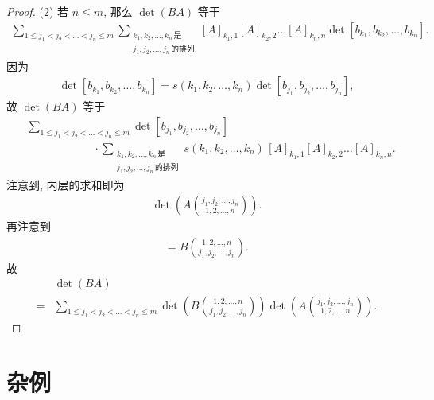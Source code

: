 \documentclass[%
    UTF8,%
    fontset=none,%
    punct=kaiming,%
    zihao=-4,%
    a4paper,%
    oneside,%
]{ctexbook}
\renewcommand*{\leq}{\leqslant}
\begin{document}
\begin{proof}
    (2)
    若 \(n \leq m\),
    那么 \(\det {(BA)}\) 等于
    \begin{align*}
        \sum_{1 \leq j_1 < j_2 < \dots < j_n \leq m}
        {\sum_{\substack{
        k_1, k_2, \dots, k_n\,\text{是} \\
                    j_1, j_2, \dots, j_n\,\text{的排列}
                }}
            {[A]_{k_1,1} [A]_{k_2,2} \dots [A]_{k_n,n}
                \det {[b_{k_1}, b_{k_2}, \dots, b_{k_n}]}}}.
    \end{align*}
    因为
    \begin{align*}
        \det {[b_{k_1}, b_{k_2}, \dots, b_{k_n}]}
        = s(k_1, k_2, \dots, k_n)
        \det {[b_{j_1}, b_{j_2}, \dots, b_{j_n}]},
    \end{align*}
    故 \(\det {(BA)}\) 等于
    \begin{align*}
         &
        \sum_{1 \leq j_1 < j_2 < \dots < j_n \leq m}
        {\det {[b_{j_1}, b_{j_2}, \dots, b_{j_n}]}}
        \\
         & \qquad \qquad \qquad
        \cdot
        \sum_{\substack{
        k_1, k_2, \dots, k_n\,\text{是} \\
                j_1, j_2, \dots, j_n\,\text{的排列}
            }}
        {s(k_1, k_2, \dots, k_n)\,
            [A]_{k_1,1} [A]_{k_2,2} \dots [A]_{k_n,n}}.
    \end{align*}
    注意到, 内层的求和即为
    \begin{align*}
        \det {\left(
            A\binom{j_1, j_2, \dots, j_n}{1, 2, \dots, n}
            \right)}.
    \end{align*}
    再注意到
    \begin{align*}
        [b_{j_1}, b_{j_2}, \dots, b_{j_n}]
        = B\binom{1, 2, \dots, n}{j_1, j_2, \dots, j_n}.
    \end{align*}
    故
    \begin{align*}
             & \det {(BA)}
        \\
        = {} & \sum_{1 \leq j_1 < j_2 < \dots < j_n \leq m}
        {
            \det {\left(
                B\binom{1, 2, \dots, n}{j_1, j_2, \dots, j_n}
                \right)}
            \det {\left(
                A\binom{j_1, j_2, \dots, j_n}{1, 2, \dots, n}
                \right)}
        }.
    \end{align*}

\end{proof}

\section{杂例}
\end{document}
